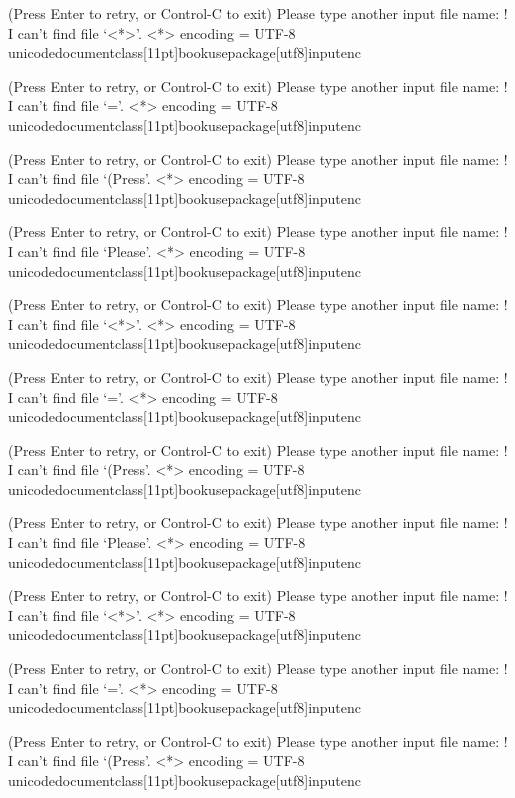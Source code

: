 (Press Enter to retry, or Control-C to exit)
Please type another input file name: ! I can't find file `<*>'.
<*> encoding 
             = UTF-8 unicodedocumentclass[11pt]{book}usepackage[utf8]{inputenc}

(Press Enter to retry, or Control-C to exit)
Please type another input file name: ! I can't find file `='.
<*> encoding 
             = UTF-8 unicodedocumentclass[11pt]{book}usepackage[utf8]{inputenc}

(Press Enter to retry, or Control-C to exit)
Please type another input file name: ! I can't find file `(Press'.
<*> encoding 
             = UTF-8 unicodedocumentclass[11pt]{book}usepackage[utf8]{inputenc}

(Press Enter to retry, or Control-C to exit)
Please type another input file name: ! I can't find file `Please'.
<*> encoding 
             = UTF-8 unicodedocumentclass[11pt]{book}usepackage[utf8]{inputenc}

(Press Enter to retry, or Control-C to exit)
Please type another input file name: ! I can't find file `<*>'.
<*> encoding 
             = UTF-8 unicodedocumentclass[11pt]{book}usepackage[utf8]{inputenc}

(Press Enter to retry, or Control-C to exit)
Please type another input file name: ! I can't find file `='.
<*> encoding 
             = UTF-8 unicodedocumentclass[11pt]{book}usepackage[utf8]{inputenc}

(Press Enter to retry, or Control-C to exit)
Please type another input file name: ! I can't find file `(Press'.
<*> encoding 
             = UTF-8 unicodedocumentclass[11pt]{book}usepackage[utf8]{inputenc}

(Press Enter to retry, or Control-C to exit)
Please type another input file name: ! I can't find file `Please'.
<*> encoding 
             = UTF-8 unicodedocumentclass[11pt]{book}usepackage[utf8]{inputenc}

(Press Enter to retry, or Control-C to exit)
Please type another input file name: ! I can't find file `<*>'.
<*> encoding 
             = UTF-8 unicodedocumentclass[11pt]{book}usepackage[utf8]{inputenc}

(Press Enter to retry, or Control-C to exit)
Please type another input file name: ! I can't find file `='.
<*> encoding 
             = UTF-8 unicodedocumentclass[11pt]{book}usepackage[utf8]{inputenc}

(Press Enter to retry, or Control-C to exit)
Please type another input file name: ! I can't find file `(Press'.
<*> encoding 
             = UTF-8 unicodedocumentclass[11pt]{book}usepackage[utf8]{inputenc}

